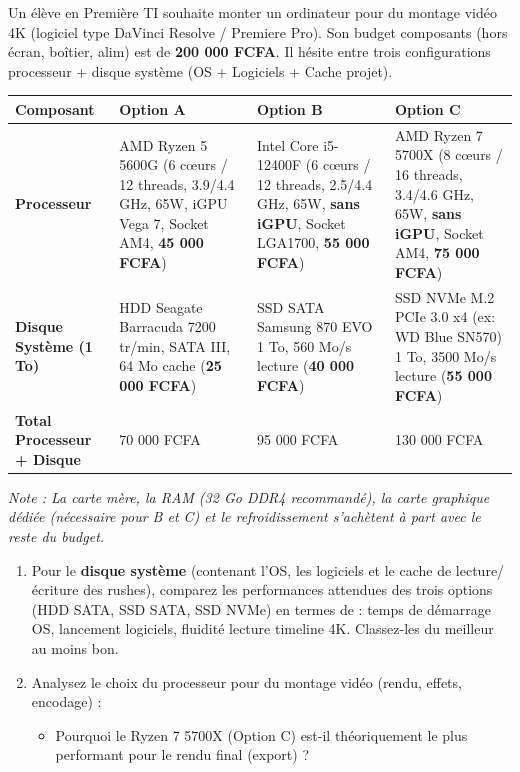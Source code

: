\documentclass[11pt]{article}
\begin{document}
\begin{exercice}
Un élève en Première TI souhaite monter un ordinateur pour du montage vidéo 4K (logiciel type DaVinci Resolve / Premiere Pro). Son budget composants (hors écran, boîtier, alim) est de \textbf{200 000 FCFA}. Il hésite entre trois configurations processeur + disque système (OS + Logiciels + Cache projet).

\begin{center}
\begin{tabularx}{\linewidth}{|l|X|X|X|}
\hline
\rowcolor{popblueL}
\textbf{Composant} & \textbf{Option A} & \textbf{Option B} & \textbf{Option C} \\ \hline
\textbf{Processeur} & AMD Ryzen 5 5600G (6 cœurs / 12 threads, 3.9/4.4 GHz, 65W, iGPU Vega 7, Socket AM4, \textbf{45 000 FCFA}) & Intel Core i5-12400F (6 cœurs / 12 threads, 2.5/4.4 GHz, 65W, \textbf{sans iGPU}, Socket LGA1700, \textbf{55 000 FCFA}) & AMD Ryzen 7 5700X (8 cœurs / 16 threads, 3.4/4.6 GHz, 65W, \textbf{sans iGPU}, Socket AM4, \textbf{75 000 FCFA}) \\ \hline
\textbf{Disque Système (1 To)} & HDD Seagate Barracuda 7200 tr/min, SATA III, 64 Mo cache (\textbf{25 000 FCFA}) & SSD SATA Samsung 870 EVO 1 To, 560 Mo/s lecture (\textbf{40 000 FCFA}) & SSD NVMe M.2 PCIe 3.0 x4 (ex: WD Blue SN570) 1 To, 3500 Mo/s lecture (\textbf{55 000 FCFA}) \\ \hline
\textbf{Total Processeur + Disque} & 70 000 FCFA & 95 000 FCFA & 130 000 FCFA \\ \hline
\end{tabularx}
\end{center}
\textit{Note : La carte mère, la RAM (32 Go DDR4 recommandé), la carte graphique dédiée (nécessaire pour B et C) et le refroidissement s'achètent à part avec le reste du budget.}
\begin{enumerate}
    \item Pour le \textbf{disque système} (contenant l'OS, les logiciels et le cache de lecture/écriture des rushes), comparez les performances attendues des trois options (HDD SATA, SSD SATA, SSD NVMe) en termes de : temps de démarrage OS, lancement logiciels, fluidité lecture timeline 4K. Classez-les du meilleur au moins bon.
    \item Analysez le choix du processeur pour du montage vidéo (rendu, effets, encodage) :
    \begin{itemize}
        \item[a)] Pourquoi le Ryzen 7 5700X (Option C) est-il théoriquement le plus performant pour le rendu final (export) ?

\end{itemize}
\end{enumerate}
\end{exercice}
\end{document}
